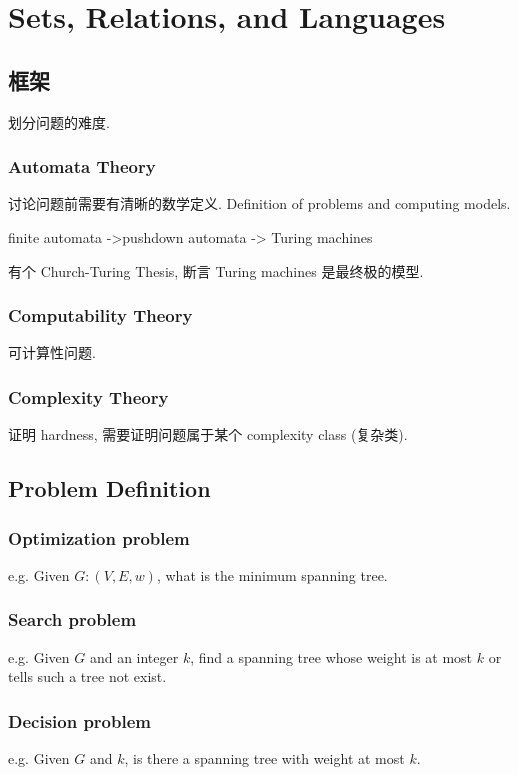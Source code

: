 \newpage
\section{Sets, Relations, and Languages}

\subsection{框架}
划分问题的难度. 
\subsubsection{Automata Theory}
讨论问题前需要有清晰的数学定义. Definition of problems and computing models. 

finite automata ->pushdown automata -> Turing machines 

有个 Church-Turing Thesis, 断言 Turing machines 是最终极的模型. 

\subsubsection{Computability Theory}
可计算性问题. 

\subsubsection{Complexity Theory}
证明 hardness, 需要证明问题属于某个 complexity class (复杂类). 


\subsection{Problem Definition}

\subsubsection{Optimization problem}
e.g. Given $G:(V,E,w)$, what is the minimum spanning tree. 

\subsubsection{Search problem}
e.g. Given $G$ and an integer $k$, find a spanning tree whose weight is at most $k$ or tells such a tree not exist. 

\subsubsection{Decision problem}
e.g. Given $G$ and $k$, is there a spanning tree with weight at most $k$. 

